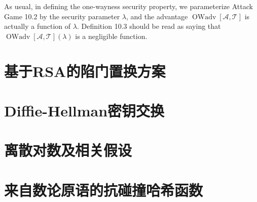 As usual, in defining the one-wayness security property, we parameterize Attack Game 10.2 by the security parameter $\lambda$, and the advantage $\operatorname{OWadv}[\mathcal{A}, \mathcal{T}]$ is actually a function of $\lambda$. Definition 10.3 should be read as saying that $\operatorname{OWadv}[\mathcal{A}, \mathcal{T}](\lambda)$ is a negligible function.




\section{基于RSA的陷门置换方案}\label{10.3}
\section{Diffie-Hellman密钥交换}\label{10.4}
\section{离散对数及相关假设}\label{10.5}
\section{来自数论原语的抗碰撞哈希函数}\label{10.6}
